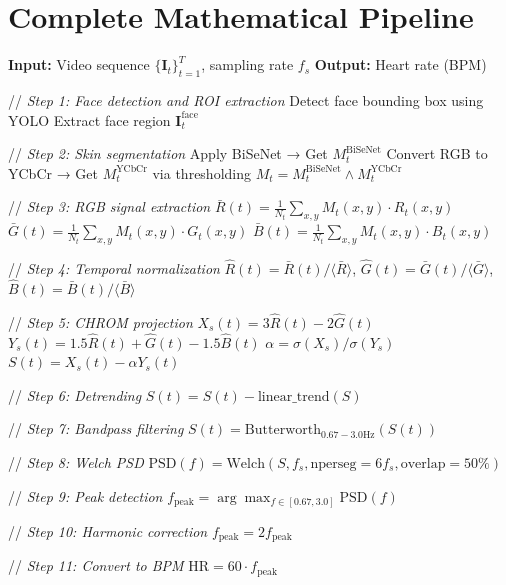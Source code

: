 \documentclass[11pt,a4paper]{article}
\newcommand{\mat}[1]{\mathbf{#1}}
\begin{document}
\section{Complete Mathematical Pipeline}

\begin{algorithm}[H]
\caption{Complete rPPG Heart Rate Estimation}
\begin{algorithmic}[1]
\State \textbf{Input:} Video sequence $\{\mat{I}_t\}_{t=1}^{T}$, sampling rate $f_s$
\State \textbf{Output:} Heart rate (BPM)

\State // \textit{Step 1: Face detection and ROI extraction}
    \State Detect face bounding box using YOLO
    \State Extract face region $\mat{I}_t^{\text{face}}$
\EndFor

\State // \textit{Step 2: Skin segmentation}
    \State Apply BiSeNet → Get $M_t^{\text{BiSeNet}}$
    \State Convert RGB to YCbCr → Get $M_t^{\text{YCbCr}}$ via thresholding
    \State $M_t = M_t^{\text{BiSeNet}} \land M_t^{\text{YCbCr}}$
\EndFor

\State // \textit{Step 3: RGB signal extraction}
    \State $\bar{R}(t) = \frac{1}{N_t} \sum_{x,y} M_t(x,y) \cdot R_t(x,y)$
    \State $\bar{G}(t) = \frac{1}{N_t} \sum_{x,y} M_t(x,y) \cdot G_t(x,y)$
    \State $\bar{B}(t) = \frac{1}{N_t} \sum_{x,y} M_t(x,y) \cdot B_t(x,y)$
\EndFor

\State // \textit{Step 4: Temporal normalization}
\State $\hat{R}(t) = \bar{R}(t) / \langle \bar{R} \rangle$, $\hat{G}(t) = \bar{G}(t) / \langle \bar{G} \rangle$, $\hat{B}(t) = \bar{B}(t) / \langle \bar{B} \rangle$

\State // \textit{Step 5: CHROM projection}
\State $X_s(t) = 3\hat{R}(t) - 2\hat{G}(t)$
\State $Y_s(t) = 1.5\hat{R}(t) + \hat{G}(t) - 1.5\hat{B}(t)$
\State $\alpha = \sigma(X_s) / \sigma(Y_s)$
\State $S(t) = X_s(t) - \alpha Y_s(t)$

\State // \textit{Step 6: Detrending}
\State $S(t) = S(t) - \text{linear\_trend}(S)$

\State // \textit{Step 7: Bandpass filtering}
\State $S(t) = \text{Butterworth}_{0.67-3.0\text{Hz}}(S(t))$

\State // \textit{Step 8: Welch PSD}
\State $\text{PSD}(f) = \text{Welch}(S, f_s, \text{nperseg}=6f_s, \text{overlap}=50\%)$

\State // \textit{Step 9: Peak detection}
\State $f_{\text{peak}} = \arg\max_{f \in [0.67, 3.0]} \text{PSD}(f)$

\State // \textit{Step 10: Harmonic correction}
    \State $f_{\text{peak}} = 2 f_{\text{peak}}$
\EndIf

\State // \textit{Step 11: Convert to BPM}
\State \Return $\text{HR} = 60 \cdot f_{\text{peak}}$
\end{algorithmic}
\end{algorithm}
\end{document}
